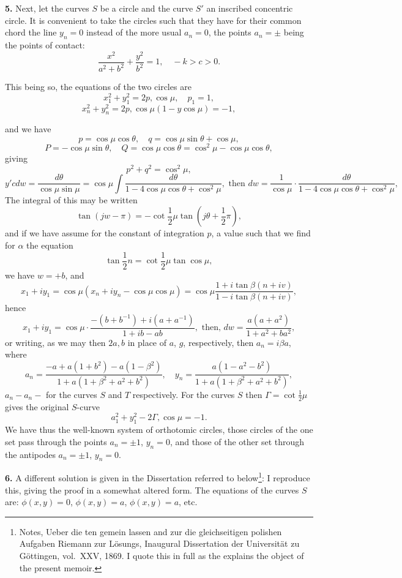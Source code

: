 \documentclass[11pt,a4paper]{article}
\begin{document}
\textbf{5.} Next, let the curves $S$ be a circle and the curve $S'$ an inscribed concentric circle. It is convenient to take the circles such that they have for their common chord the line $y_n = 0$ instead of the more usual $a_n = 0$, the points $a_n = \pm$ being the points of contact:
\[
\frac{x^2}{a^2 + b^2} + \frac{y^2}{b^2} = 1, \quad - k > c > 0.
\]

This being so, the equations of the two circles are
\[
x_1^2 + y_1^2 = 2p, \cos \mu, \quad p_1 = 1,
\]
\[
x_n^2 + y_n^2 = 2p, \cos \mu (1 - y \cos \mu) = - 1,
\]

and we have
\[
p = \cos \mu \cos \theta, \quad q = \cos \mu \sin \theta + \cos \mu,
\]
\[
P = -\cos \mu \sin \theta, \quad Q = \cos \mu \cos \theta = \cos^2 \mu - \cos \mu \cos \theta,
\]
giving
\[
p^2 + q^2 = \cos^2 \mu,
\]
\[
y' c d w = \frac{d\theta}{\cos \mu \sin \mu} = \cos \mu \int \frac{d\theta}{1 - 4 \cos \mu \cos \theta + \cos^2 \mu}, \text{ then } dw = \frac{1}{\cos \mu} \cdot \frac{d \theta}{1 - 4 \cos \mu \cos \theta + \cos^2 \mu},
\]
The integral of this may be written
\[
\tan (jw - \pi) = - \cot \frac{1}{2}\mu \tan (j\theta + \frac{1}{2}\pi),
\]
and if we have assume for the constant of integration $p$, a value such that
we find for $\alpha$ the equation
\[
\tan \frac{1}{2}n = \cot \frac{1}{2}\mu \tan \cos \mu,
\]
we have $w = + b$, and
\[
x_1 + i y_1 = \cos \mu (x_n + i y_n - \cos \mu \cos \mu) = \cos \mu \frac{1 + i \tan \beta(n + i v)}{1 - i \tan \beta(n + i v)},
\]
hence
\[
x_1 + i y_1 = \cos \mu \cdot \frac{- (b + b^{-1}) + i (a + a^{-1})}{1 + i b - a b}, \text{ then, } dw = \frac{a (a + a^2)}{1 + a^2 + b a^2},
\]
or writing, as we may then $2 a, b$ in place of $a$, $g$, respectively, then $a_n = i \beta a$, where
\[
a_n = \frac{- a + a (1 + b^2) - a(1 - \beta^2)}{1 + a (1 + \beta^2 + a^2 + b^2)}, \quad y_n = \frac{a (1 - a^2 - b^2)}{1 + a (1 + \beta^2 + a^2 + b^2)},
\]
$a_n - a_n -$ for the curves $S$ and $T$ respectively. For the curves $S$ then $\Gamma = \cot \frac{1}{2}\mu$ gives the original $S$-curve
\[
a_1^2 + y_1^2 - 2\Gamma, \cos \mu = - 1.
\]
We have thus the well-known system of orthotomic circles, those circles of the one set pass through the points $a_n = \pm 1$, $y_n = 0$, and those of the other set through the antipodes $a_n = \pm 1$, $y_n = 0$.

\textbf{6.} A different solution is given in the Dissertation referred to below\footnote{Notes, Ueber die ten gemein lassen and zur die gleichseitigen polishen Aufgaben Riemann zur Lösungs, Inaugural Dissertation der Universität zu Göttingen, vol.~XXV, 1869. I quote this in full as the explains the object of the present memoir.}: I reproduce this, giving the proof in a somewhat altered form. The equations of the curves $S$ are: $\phi(x, y) = 0$, $\phi(x, y) = a$, $\phi(x, y) = a$, etc.
\end{document}
